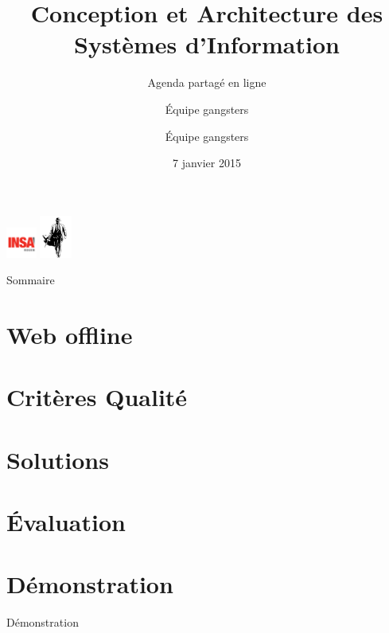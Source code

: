 \documentclass[9pt,table]{beamer}
\title{Conception et Architecture des Systèmes d'Information}
\subtitle{Agenda partagé en ligne}
\author{Équipe gangsters}
\date{7 janvier 2015}
\begin{document}
\begin{frame}[plain]
	\titlepage
	\begin{center}
		\includegraphics[height=10mm]{images/logoInsa} \hspace{0.5cm}
		\includegraphics[height=14mm]{images/logoGangsters} \hspace{0.5cm}
	\end{center}
\end{frame}

\begin{frame}{Sommaire}
	 \vspace{1cm}
	 \tableofcontents
\end{frame}
\section{Web offline}


\section{Critères Qualité}


\section{Solutions}


\section{\'Evaluation}


\author{Équipe gangsters}
\section{Démonstration}
\begin{frame}{Démonstration}
 
\end{frame}
\end{document}
